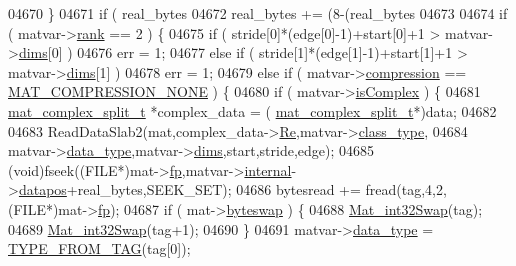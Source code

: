 \begin{DoxyCode}
{{{{{{{{{{{{{{{{{{{{{{{{{{04670     \}
04671     \textcolor{keywordflow}{if} ( real\_bytes %
04672         real\_bytes += (8-(real\_bytes %
04673 
04674     \textcolor{keywordflow}{if} ( matvar->\hyperlink{group___m_a_t_a84ba70c96ded13cc555fa75b768d9921}{rank} == 2 ) \{
04675         \textcolor{keywordflow}{if} ( stride[0]*(edge[0]-1)+start[0]+1 > matvar->\hyperlink{group___m_a_t_a8e01234e1c862ce3472bb37f5a09b92c}{dims}[0] )
04676             err = 1;
04677         \textcolor{keywordflow}{else} \textcolor{keywordflow}{if} ( stride[1]*(edge[1]-1)+start[1]+1 > matvar->\hyperlink{group___m_a_t_a8e01234e1c862ce3472bb37f5a09b92c}{dims}[1] )
04678             err = 1;
04679         \textcolor{keywordflow}{else} \textcolor{keywordflow}{if} ( matvar->\hyperlink{group___m_a_t_aeef0466048621cb2c959ba7f6c774d06}{compression} == \hyperlink{group___m_a_t_gga768c318af97bd2567758ecb001ceb7f4a2280b97631ff5dd24dec55261dc587b6}{MAT\_COMPRESSION\_NONE} ) \{
04680             \textcolor{keywordflow}{if} ( matvar->\hyperlink{group___m_a_t_aeb03b3a69f108dc05470b00443a43739}{isComplex} ) \{
04681                 \hyperlink{group___m_a_t_structmat__complex__split__t}{mat\_complex\_split\_t} *complex\_data = (
      \hyperlink{group___m_a_t_structmat__complex__split__t}{mat\_complex\_split\_t}*)data;
04682 
04683                 ReadDataSlab2(mat,complex\_data->\hyperlink{group___m_a_t_a484a93607508adac2bce53a0252e0325}{Re},matvar->\hyperlink{group___m_a_t_aff13035bf3265dd7d9425e5d40c839d4}{class\_type},
04684                     matvar->\hyperlink{group___m_a_t_ab6aafe9bd77f0f077852593dec438144}{data\_type},matvar->\hyperlink{group___m_a_t_a8e01234e1c862ce3472bb37f5a09b92c}{dims},start,stride,edge);
04685                 (void)fseek((FILE*)mat->\hyperlink{struct__mat__t_a85f562e407ca9ad4d2a6e14f839432b7}{fp},matvar->\hyperlink{group___m_a_t_a6e97e3ed9f40c49322c18561c2a94e92}{internal}->\hyperlink{structmatvar__internal_afd3bfaab126a160bd6855563e1ea0a7e}{datapos}+real\_bytes,SEEK\_SET);
04686                 bytesread += fread(tag,4,2,(FILE*)mat->\hyperlink{struct__mat__t_a85f562e407ca9ad4d2a6e14f839432b7}{fp});
04687                 \textcolor{keywordflow}{if} ( mat->\hyperlink{struct__mat__t_a99d207977af5e04941ace56d71817a40}{byteswap} ) \{
04688                     \hyperlink{endian_8c_a2e0153996243f0a34df9a5286087cfa3}{Mat\_int32Swap}(tag);
04689                     \hyperlink{endian_8c_a2e0153996243f0a34df9a5286087cfa3}{Mat\_int32Swap}(tag+1);
04690                 \}
04691                 matvar->\hyperlink{group___m_a_t_ab6aafe9bd77f0f077852593dec438144}{data\_type} = \hyperlink{mat5_8c_a82bacecc4afc633b61bc3dc8ef88d1ed}{TYPE\_FROM\_TAG}(tag[0]);
}}}}}}}}}}}}}}}}}}}}}}}}}}
\end{DoxyCode}
